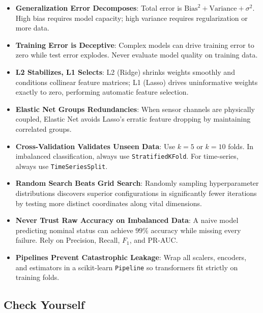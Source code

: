 \begin{takeaways}
\begin{itemize}
    \item \textbf{Generalization Error Decomposes}: Total error is $\text{Bias}^2 + \text{Variance} + \sigma^2$. High bias requires model capacity; high variance requires regularization or more data.
    \item \textbf{Training Error is Deceptive}: Complex models can drive training error to zero while test error explodes. Never evaluate model quality on training data.
    \item \textbf{L2 Stabilizes, L1 Selects}: L2 (Ridge) shrinks weights smoothly and conditions collinear feature matrices; L1 (Lasso) drives uninformative weights exactly to zero, performing automatic feature selection.
    \item \textbf{Elastic Net Groups Redundancies}: When sensor channels are physically coupled, Elastic Net avoids Lasso's erratic feature dropping by maintaining correlated groups.
    \item \textbf{Cross-Validation Validates Unseen Data}: Use $k=5$ or $k=10$ folds. In imbalanced classification, always use \texttt{StratifiedKFold}. For time-series, always use \texttt{TimeSeriesSplit}.
    \item \textbf{Random Search Beats Grid Search}: Randomly sampling hyperparameter distributions discovers superior configurations in significantly fewer iterations by testing more distinct coordinates along vital dimensions.
    \item \textbf{Never Trust Raw Accuracy on Imbalanced Data}: A naive model predicting nominal status can achieve $99\%$ accuracy while missing every failure. Rely on Precision, Recall, $F_1$, and PR-AUC.
    \item \textbf{Pipelines Prevent Catastrophic Leakage}: Wrap all scalers, encoders, and estimators in a scikit-learn \texttt{Pipeline} so transformers fit strictly on training folds.
\end{itemize}
\end{takeaways}

\subsection{Check Yourself}\label{subsec:model_quality_check_yourself}

